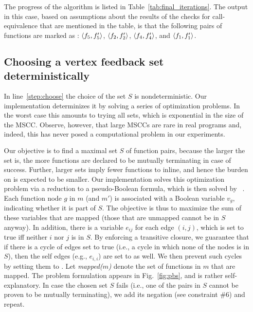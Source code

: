 The progress of the algorithm is listed in Table~\ref{tab:final_iterations}. The output in this case, based on assumptions about the results of the checks for call-equivalence that are mentioned in the table, is that the following pairs of functions are marked as \mtlabel: $\langle f_5,f_5'\rangle$, $\langle f_2,f_2'\rangle$, $\langle f_4,f_4'\rangle$, and $\langle f_1,f_1'\rangle$.
%
\subsection{Choosing a vertex feedback set deterministically} \label{sec:determinization}
In line~\ref{step:choose} the choice of the set $S$ is nondeterministic. Our
implementation determinizes it by solving a series of optimization problems. In
the worst case this amounts to trying all sets, which is exponential in the
size of the MSCC. Observe, however, that large MSCCs are rare in real programs
and, indeed, this has never posed a
computational problem in our experiments.

Our objective is to find a maximal
set $S$ of function pairs, because the larger the set is, the more functions
are declared to be mutually terminating in case of success. Further, larger
sets imply fewer functions to inline, and hence the burden on \CheckCallEquiv
is expected to be smaller.
%
Our implementation solves this optimization problem via a reduction to a pseudo-Boolean formula, which is then solved by ~\cite{ES06}. Each function node $g$ in $m$ (and $m'$) is associated with a Boolean variable $v_g$, indicating whether it is part of $S$. The objective is thus to maximize the sum of these variables that are mapped (those that are unmapped cannot be in $S$ anyway). In addition, there is a variable $e_{ij}$ for each edge $(i,j)$, which is set to true iff neither $i$ nor $j$ is in $S$. By enforcing a transitive closure, we guarantee that if there is a cycle of edges set to true (i.e., a cycle in which none of the nodes is in $S$), then the self edges (e.g., $e_{i,i}$) are set to \true as well. We then prevent such cycles by setting them to \false.
Let \emph{mapped($m$)} denote the set of functions in $m$ that are mapped. The problem formulation appears in Fig.~\ref{fig:pbs}, and is rather self-explanatory.
In case the chosen set $S$ fails (i.e., one of the pairs in $S$ cannot be proven to be mutually terminating), we add its negation (see constraint \#6) and repeat.

